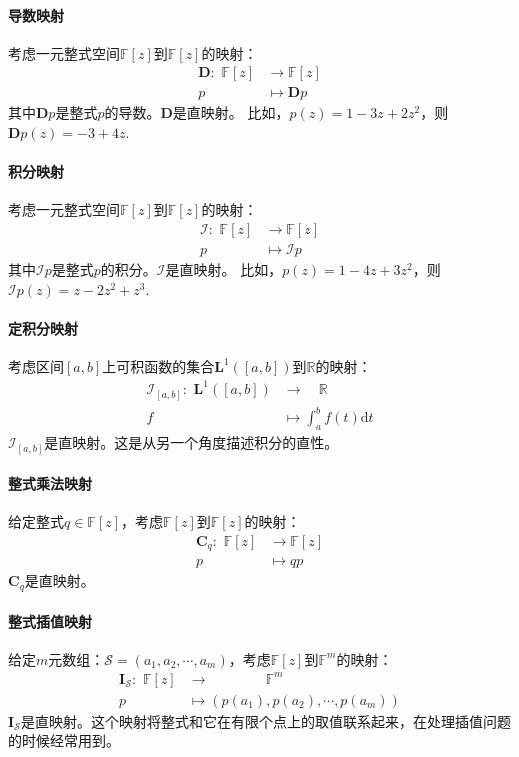 \documentclass[12pt,UTF8,fontset=none]{ctexbook}
\begin{document}
\paragraph{导数映射} 考虑一元整式空间$\mathbb{F}[z]$到$\mathbb{F}[z]$的映射：
\begin{align*}
    \mathbf{D}: \,\, \mathbb{F}[z] & \to \mathbb{F}[z]  \\
    p & \mapsto \mathbf{D}p 
\end{align*}
其中$\mathbf{D}p$是整式$p$的导数。$\mathbf{D}$是直映射。
比如，$p(z) = 1 - 3z + 2z^2$，则$\mathbf{D}p(z) = -3 + 4z.$

\paragraph{积分映射} 考虑一元整式空间$\mathbb{F}[z]$到$\mathbb{F}[z]$的映射：
\begin{align*}
    \mathcal{I}: \,\, \mathbb{F}[z] & \to \mathbb{F}[z]  \\
    p & \mapsto \mathcal{I}p 
\end{align*}
其中$\mathcal{I}p$是整式$p$的积分。$\mathcal{I}$是直映射。
比如，$p(z) = 1 - 4z + 3z^2$，则$\mathcal{I}p(z) = z - 2z^2+ z^3.$

\paragraph{定积分映射} 考虑区间$[a,b]$上可积函数的集合$\mathbf{L}^1([a,b])$到$\mathbb{R}$的映射：
\begin{align*}
    \mathcal{I}_{[a,b]}: \,\, \mathbf{L}^1([a,b]) & \to \quad\mathbb{R}  \\
    f\quad & \mapsto \int_a^b f(t)\mathrm{d}t 
\end{align*}
$\mathcal{I}_{[a,b]}$是直映射。这是从另一个角度描述积分的直性。

\paragraph{整式乘法映射} 给定整式$q\in\mathbb{F}[z]$，考虑$\mathbb{F}[z]$到$\mathbb{F}[z]$的映射：
\begin{align*}
    \mathbf{C}_{q}: \,\, \mathbb{F}[z] & \to \mathbb{F}[z]  \\
    p\quad & \mapsto qp 
\end{align*}
$\mathbf{C}_{q}$是直映射。

\paragraph{整式插值映射} 给定$m$元数组：$\mathcal{S} = (a_1, a_2, \cdots, a_m)$，考虑$\mathbb{F}[z]$到$\mathbb{F}^m$的映射：
\begin{align*}
    \mathbf{I}_{\mathcal{S}}: \,\, \mathbb{F}[z] & \to \qquad\qquad\mathbb{F}^m  \\
    p\quad & \mapsto \left(p(a_1), p(a_2), \cdots, p(a_m)\right) 
\end{align*}
$\mathbf{I}_{\mathcal{S}}$是直映射。这个映射将整式和它在有限个点上的取值联系起来，在处理插值问题的时候经常用到。
\end{document}
